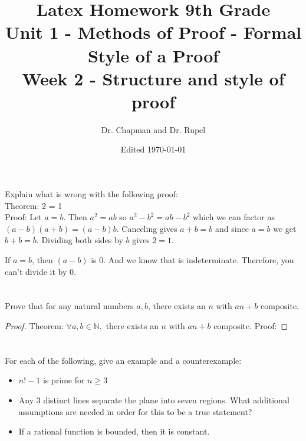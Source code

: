 \documentclass{amsart}
\title{Latex Homework 9th Grade\\ Unit 1 - Methods of Proof - Formal Style of a Proof\\ Week 2 - Structure and style of proof}
\author{Dr. Chapman and Dr. Rupel}
\date{Edited \today}
\begin{document}
\maketitle

\section{}
    Explain what is wrong with the following proof:\\ Theorem: 2 = 1\\Proof: Let \(a = b\). Then \(a^2 = ab\) so \(a^2-b^2 = ab - b^2\) which we can factor as \((a-b)(a+b) = (a-b)b\). Canceling gives \(a+b = b\) and since \(a = b\) we get \(b+b = b\). Dividing both sides by \(b\) gives \(2 = 1\).

	If \( a = b\), then \((a-b)\) is 0. And we know that  is indeterminate. Therefore, you can't divide it by 0.
\section{}
    Prove that for any natural numbers \(a,b\), there exists an \(n\) with \(an+b\) composite.
	\begin{proof}
	Theorem: $\forall a,b\in\mathbb{N},$ there exists an $n$ with $an+b$ composite.
	Proof: 
	\end{proof}
    
\section{}
    For each of the following, give an example and a counterexample:
    \begin{itemize}
        \item \(n!-1\) is prime for \(n \geq 3\)
        \item Any 3 distinct lines separate the plane into seven regions.  What additional assumptions are needed in order for this to be a true statement?
        \item If a rational function is bounded, then it is constant.
    \end{itemize}
    
\end{document}
